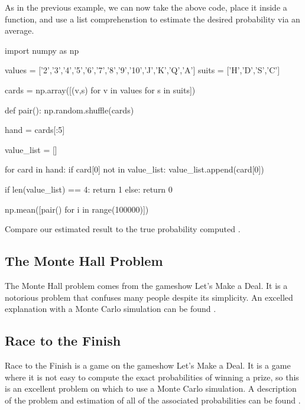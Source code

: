 \documentclass{ximera}
\begin{document}
As in the previous example, we can now take the above code, place it inside a function, and use a list comprehenstion to estimate the desired probability via an average.

\begin{sageCell}
import numpy as np

values = ['2','3','4','5','6','7','8','9','10','J','K','Q','A']
suits = ['H','D','S','C']

cards = np.array([(v,s) for v in values for s in suits])

def pair():
        np.random.shuffle(cards)

        hand = cards[:5]

        value_list = []

        for card in hand:
                if card[0] not in value_list:
                        value_list.append(card[0])

        if len(value_list) == 4:
                return 1
        else:
                return 0

np.mean([pair() for i in range(100000)])
\end{sageCell}

Compare our estimated result to the true probability computed .

\subsection{The Monte Hall Problem}

The Monte Hall problem comes from the gameshow Let's Make a Deal. It is a notorious problem that confuses many people despite its simplicity. An excelled explanation with a Monte Carlo simulation can be found .

\subsection{Race to the Finish}

Race to the Finish is a game on the gameshow Let's Make a Deal. It is a game where it is not easy to compute the exact probabilities of winning a prize, so this is an excellent problem on which to use a Monte Carlo simulation. A description of the problem and estimation of all of the associated probabilities can be found .
\end{document}
